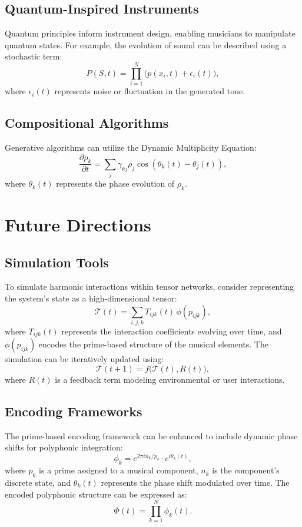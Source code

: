 \documentclass{article}
\theoremstyle{plain}
\begin{document}
\subsection{Quantum-Inspired Instruments}
Quantum principles inform instrument design, enabling musicians to manipulate quantum states. For example, the evolution of sound can be described using a stochastic term:
\begin{equation}
P(S, t) = \prod_{i=1}^N \big(p(x_i, t) + \epsilon_i(t)\big),
\end{equation}
where $\epsilon_i(t)$ represents noise or fluctuation in the generated tone.

\subsection{Compositional Algorithms}
Generative algorithms can utilize the Dynamic Multiplicity Equation:\
\begin{equation}
\frac{\partial \rho_k}{\partial t} = \sum_{j} \gamma_{kj} \rho_j \cos(\theta_k(t) - \theta_j(t)),
\end{equation}
where $\theta_k(t)$ represents the phase evolution of $\rho_k$.

\section{Future Directions}

\subsection{Simulation Tools}
To simulate harmonic interactions within tensor networks, consider representing the system's state as a high-dimensional tensor:
\[
\mathcal{T}(t) = \sum_{i,j,k} T_{ijk}(t) \, \phi(p_{ijk}),
\]
where $T_{ijk}(t)$ represents the interaction coefficients evolving over time, and $\phi(p_{ijk})$ encodes the prime-based structure of the musical elements. The simulation can be iteratively updated using:
\[
\mathcal{T}(t+1) = f\big(\mathcal{T}(t), R(t)\big),
\]
where $R(t)$ is a feedback term modeling environmental or user interactions.

\subsection{Encoding Frameworks}
The prime-based encoding framework can be enhanced to include dynamic phase shifts for polyphonic integration:
\[
\phi_k = e^{2\pi i n_k / p_k} \cdot e^{i \theta_k(t)},
\]
where $p_k$ is a prime assigned to a musical component, $n_k$ is the component's discrete state, and $\theta_k(t)$ represents the phase shift modulated over time. The encoded polyphonic structure can be expressed as:
\[
\Phi(t) = \prod_{k=1}^N \phi_k(t).
\]
\end{document}
